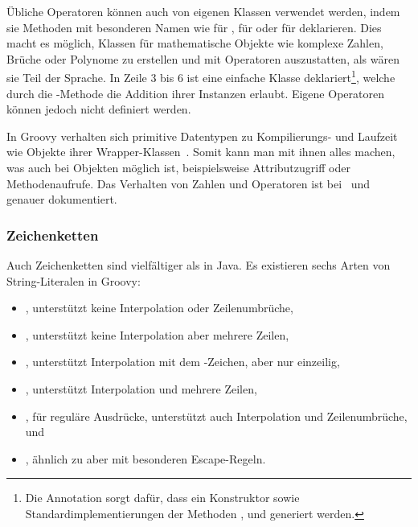 \documentclass[a4paper]{article}
\begin{document}
Übliche Operatoren können auch von eigenen Klassen verwendet werden, indem sie Methoden mit besonderen Namen wie  für \code{+},  für \code{<<} oder  für \code{++} deklarieren.
Dies macht es möglich, Klassen für mathematische Objekte wie komplexe Zahlen, Brüche oder Polynome zu erstellen und mit Operatoren auszustatten, als wären sie Teil der Sprache.
In Zeile 3 bis 6 ist eine einfache Klasse  deklariert\footnote{Die Annotation  sorgt dafür, dass ein Konstruktor sowie Standardimplementierungen der Methoden ,  und  generiert werden.}, welche durch die -Methode die Addition ihrer Instanzen erlaubt.
Eigene Operatoren können jedoch nicht definiert werden.

In Groovy verhalten sich primitive Datentypen zu Kompilierungs- und Laufzeit wie Objekte ihrer Wrapper-Klassen~\cite[Abs.~10.]{groovy-lang:differences}.
Somit kann man mit ihnen alles machen, was auch bei Objekten möglich ist, beispielsweise Attributzugriff oder Methodenaufrufe.
Das Verhalten von Zahlen und Operatoren ist bei~\cite[Abs.~5.]{groovy-lang:syntax} und ~\cite[Abs.~10.]{groovy-lang:operators} genauer dokumentiert.

\subsubsection{Zeichenketten}\label{subsubsec:strings}

Auch Zeichenketten sind vielfältiger als in Java.
Es existieren sechs Arten von String-Literalen in Groovy:

\begin{itemize}\setlength{\itemsep}{0pt}\setlength{\parskip}{0pt}\setlength{\parsep}{0pt}
\item {}, unterstützt keine Interpolation oder Zeilenumbrüche,
\item {}, unterstützt keine Interpolation aber mehrere Zeilen,
\item {}, unterstützt Interpolation mit dem \code{$}-Zeichen, aber nur einzeilig,
\item {}, unterstützt Interpolation und mehrere Zeilen,
\item {}, für reguläre Ausdrücke, unterstützt auch Interpolation und Zeilenumbrüche, und
\item {}, ähnlich zu  aber mit besonderen Escape-Regeln.
\end{itemize}
\end{document}
